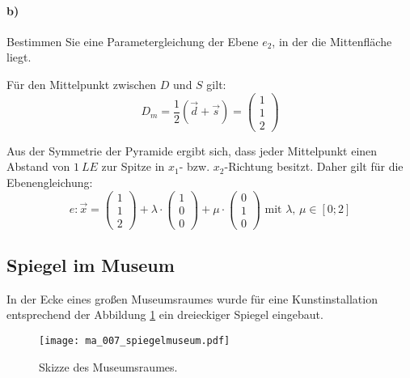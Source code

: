 \documentclass{ajc}
\numberwithin{equation}{subsection}
\begin{document}
	\paragraph{b)} Bestimmen Sie eine Parametergleichung der Ebene $e_2$, in der die Mittenfläche liegt.
	
	Für den Mittelpunkt zwischen $D$ und $S$ gilt:
	\begin{equation}
		D_m = \frac{1}{2} \left(\vec{d} + \vec{s}\right) = \left(\begin{array}{r} 1 \\ 1 \\ 2\end{array}\right)
	\end{equation}
	
	Aus der Symmetrie der Pyramide ergibt sich, dass jeder Mittelpunkt einen Abstand von $\SI{1}{LE}$ zur Spitze in $x_1$- bzw. $x_2$-Richtung besitzt. Daher gilt für die Ebenengleichung:
	\begin{equation}
		e: \overrightarrow{x}=\left(\begin{array}{r} 1 \\ 1 \\ 2\end{array}\right) + \lambda \cdot \left(\begin{array}{r} 1 \\ 0 \\ 0\end{array}\right) + \mu \cdot \left(\begin{array}{r} 0 \\ 1 \\ 0\end{array}\right) \text{ mit } \lambda,\,\mu \in \left[0;2\right]
	\end{equation}
	
	\subsection{Spiegel im Museum}
	In der Ecke eines großen Museumsraumes wurde für eine Kunstinstallation entsprechend der Abbildung \ref{fig:007_spiegel} ein dreieckiger Spiegel eingebaut. 
	\begin{figure}[ht]
		\centering
		\texttt{[image: ma\_007\_spiegelmuseum.pdf]}
		\caption{Skizze des Museumsraumes.}
		\label{fig:007_spiegel}
	\end{figure}
	
\end{document}
